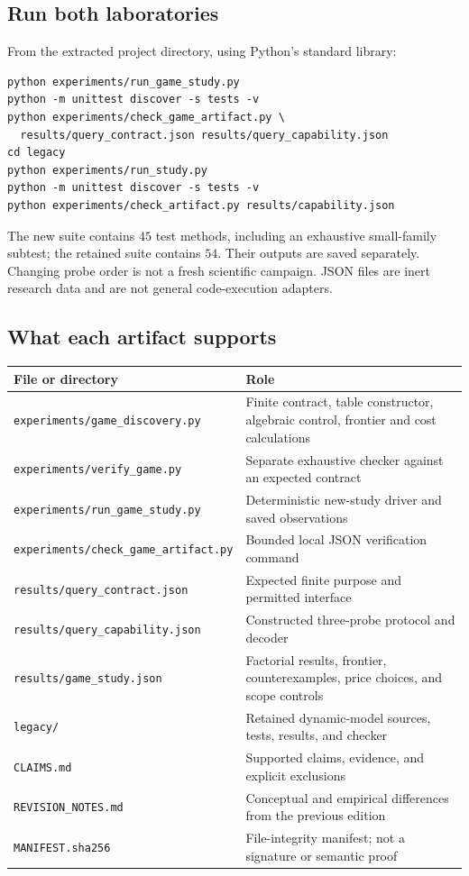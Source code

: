 \documentclass[11pt,letterpaper]{article}
\theoremstyle{remark}\newtheorem{remark}{Remark}[section]
\begin{document}
\subsection{Run both laboratories}
From the extracted project directory, using Python's standard library:
\begin{lstlisting}
python experiments/run_game_study.py
python -m unittest discover -s tests -v
python experiments/check_game_artifact.py \
  results/query_contract.json results/query_capability.json
cd legacy
python experiments/run_study.py
python -m unittest discover -s tests -v
python experiments/check_artifact.py results/capability.json
\end{lstlisting}
The new suite contains $45$ test methods, including an exhaustive small-family subtest; the retained suite contains $54$. Their outputs are saved separately. Changing probe order is not a fresh scientific campaign. JSON files are inert research data and are not general code-execution adapters.

\subsection{What each artifact supports}
\begin{table}[htbp]
\centering\small
\begin{tabularx}{\linewidth}{@{}P{.43\linewidth}Y@{}}
\toprule
File or directory & Role\\
\midrule
\texttt{experiments/game\_discovery.py} & Finite contract, table constructor, algebraic control, frontier and cost calculations\\
\texttt{experiments/verify\_game.py} & Separate exhaustive checker against an expected contract\\
\texttt{experiments/run\_game\_study.py} & Deterministic new-study driver and saved observations\\
\texttt{experiments/check\_game\_artifact.py} & Bounded local JSON verification command\\
\texttt{results/query\_contract.json} & Expected finite purpose and permitted interface\\
\texttt{results/query\_capability.json} & Constructed three-probe protocol and decoder\\
\texttt{results/game\_study.json} & Factorial results, frontier, counterexamples, price choices, and scope controls\\
\texttt{legacy/} & Retained dynamic-model sources, tests, results, and checker\\
\texttt{CLAIMS.md} & Supported claims, evidence, and explicit exclusions\\
\texttt{REVISION\_NOTES.md} & Conceptual and empirical differences from the previous edition\\
\texttt{MANIFEST.sha256} & File-integrity manifest; not a signature or semantic proof\\
\bottomrule
\end{tabularx}
\end{table}
\end{document}
